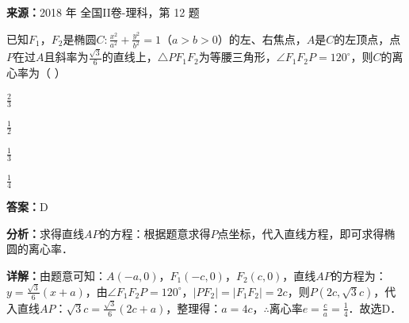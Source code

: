 \begin{question}[points=5]
\textbf{来源：}2018 年 全国II卷-理科，第 12 题\par
已知$F_1$，$F_2$是椭圆$C:\frac{x^2}{a^2}+\frac{y^2}{b^2}=1$（$a>b>0$）的左、右焦点，$A$是$C$的左顶点，点$P$在过$A$且斜率为$\frac{\sqrt{3}}{6}$的直线上，$\triangle PF_1F_2$为等腰三角形，$\angle F_1F_2P=120^\circ$，则$C$的离心率为（      ）
\begin{choices}
  \item $\frac{2}{3}$
  \item $\frac{1}{2}$
  \item $\frac{1}{3}$
  \item $\frac{1}{4}$
\end{choices}
\begin{solution}
\textbf{答案：}D

\textbf{分析：}求得直线$AP$的方程：根据题意求得$P$点坐标，代入直线方程，即可求得椭圆的离心率．

\textbf{详解：}由题意可知：$A(-a,0)$，$F_1(-c,0)$，$F_2(c,0)$，直线$AP$的方程为：$y=\frac{\sqrt{3}}{6}(x+a)$，由$\angle F_1F_2P=120^\circ$，$|PF_2|=|F_1F_2|=2c$，则$P(2c,\sqrt{3}c)$，代入直线$AP$：$\sqrt{3}c=\frac{\sqrt{3}}{6}(2c+a)$，整理得：$a=4c$，$\therefore$离心率$e=\frac{c}{a}=\frac{1}{4}$．故选D．
\end{solution}
\end{question}

